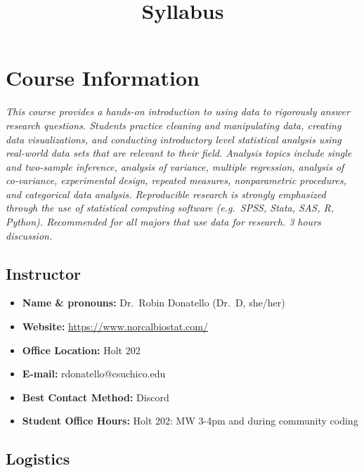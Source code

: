 \documentclass[
  letterpaper,
  DIV=11,
  numbers=noendperiod]{scrartcl}
\title{Syllabus}
\author{}
\date{}
\providecommand{\tightlist}{%
  \setlength{\itemsep}{0pt}\setlength{\parskip}{0pt}}\usepackage{longtable,booktabs,array}
\begin{document}
\maketitle
\ifdefined\Shaded\renewenvironment{Shaded}{\begin{tcolorbox}[interior hidden, sharp corners, breakable, enhanced, borderline west={3pt}{0pt}{shadecolor}, boxrule=0pt, frame hidden]}{\end{tcolorbox}}\fi

\hypertarget{course-information}{%
\section{Course Information}\label{course-information}}

\emph{This course provides a hands-on introduction to using data to
rigorously answer research questions. Students practice cleaning and
manipulating data, creating data visualizations, and conducting
introductory level statistical analysis using real-world data sets that
are relevant to their field. Analysis topics include single and
two-sample inference, analysis of variance, multiple regression,
analysis of co-variance, experimental design, repeated measures,
nonparametric procedures, and categorical data analysis. Reproducible
research is strongly emphasized through the use of statistical computing
software (e.g.~SPSS, Stata, SAS, R, Python). Recommended for all majors
that use data for research. 3 hours discussion.}

\hypertarget{instructor}{%
\subsection{Instructor}\label{instructor}}

\begin{itemize}
\tightlist
\item
  \textbf{Name \& pronouns:} Dr.~Robin Donatello (Dr.~D, she/her)
\item
  \textbf{Website:} \url{https://www.norcalbiostat.com/}
\item
  \textbf{Office Location:} Holt 202
\item
  \textbf{E-mail:} rdonatello@csuchico.edu
\item
  \textbf{Best Contact Method:} Discord
\item
  \textbf{Student Office Hours:} Holt 202: MW 3-4pm and during community
  coding
\end{itemize}

\hypertarget{logistics}{%
\subsection{Logistics}\label{logistics}}
\end{document}
